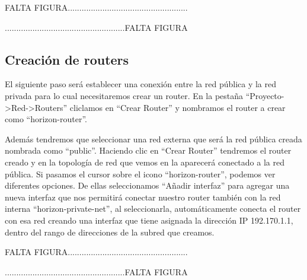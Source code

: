 \begin{tcolorbox}[colback=green!5!white,colframe=green!75!black]
FALTA FIGURA....................................................

....................................................FALTA FIGURA
\end{tcolorbox}

\subsection{Creación de routers}
El siguiente paso será establecer una conexión entre la red pública y la red privada para lo cual necesitaremos crear un router. En la pestaña “Proyecto-\textgreater Red-\textgreater Routers” cliclamos en “Crear Router” y nombramos el router a crear como “horizon-router”. 

Además tendremos que seleccionar una red externa que será la red pública creada nombrada como “public”. Haciendo clic en “Crear Router” tendremos el router creado y en la topología de red que vemos en la %
aparecerá conectado a la red pública. Si pasamos el cursor sobre el icono “horizon-router”, podemos ver diferentes opciones. De ellas seleccionamos “Añadir interfaz” para agregar una  nueva interfaz que nos permitirá conectar nuestro router también con la red interna “horizon-private-net”, al seleccionarla, automáticamente conecta el router con esa red creando una interfaz que tiene asignada la dirección IP 192.170.1.1, dentro del rango de direcciones de la subred que creamos.

\begin{tcolorbox}[colback=green!5!white,colframe=green!75!black]
FALTA FIGURA....................................................

....................................................FALTA FIGURA
\end{tcolorbox}

